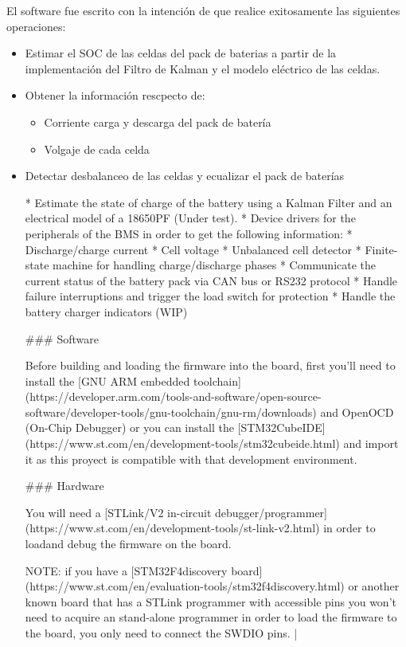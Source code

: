 \documentclass[10pt,a4paper]{article}
\begin{document}
El software fue escrito con la intención de que realice exitosamente las
siguientes operaciones: 

\begin{itemize}
    \item Estimar el \acrshort{SOC} de las celdas del pack de baterias a partir
        de la implementación del Filtro de Kalman y el modelo eléctrico de las
        celdas. 
    \item Obtener la información rescpecto de: 
        \begin{itemize}
            \item Corriente carga y descarga del pack de batería
            \item Volgaje de cada celda
        \end{itemize}
    \item Detectar desbalanceo de las celdas y ecualizar el pack de baterías

* Estimate the state of charge of the battery using a Kalman Filter and an
  electrical model of a 18650PF (Under test).
* Device drivers for the peripherals of the BMS in order to get the following information:
    * Discharge/charge current
    * Cell voltage
* Unbalanced cell detector
* Finite-state machine for handling charge/discharge phases
* Communicate the current status of the battery pack via CAN bus or
  RS232 protocol
* Handle failure interruptions and trigger the load switch for protection
* Handle the battery charger indicators (WIP)




### Software

Before building and loading the firmware into the board, first you'll need to
install the [GNU ARM embedded toolchain](https://developer.arm.com/tools-and-software/open-source-software/developer-tools/gnu-toolchain/gnu-rm/downloads) and OpenOCD (On-Chip Debugger) or you can install the [STM32CubeIDE](https://www.st.com/en/development-tools/stm32cubeide.html) and import it as this proyect is compatible with that development environment.

### Hardware

You will need a [STLink/V2 in-circuit debugger/programmer](https://www.st.com/en/development-tools/st-link-v2.html) in order to loadand debug the firmware on the board.

NOTE: if you have a [STM32F4discovery board](https://www.st.com/en/evaluation-tools/stm32f4discovery.html) or another known board that has a STLink programmer with accessible pins  you won't need to acquire an stand-alone programmer in order to load the firmware to the board, you only need to connect the SWDIO pins.
|


\end{itemize}
\end{document}
